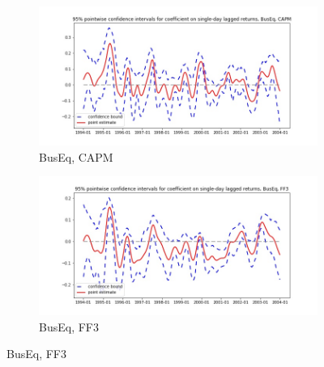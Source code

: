 \documentclass{article}
\begin{document}
\begin{figure}
  \begin{subfigure}[b]{0.5\textwidth}
    \centering
    \includegraphics[width=\textwidth]{BusEq/pointwiseCIs_CAPM.jpg}
    \caption{BusEq, CAPM}
    \label{fig:1}
  \end{subfigure}
  \begin{subfigure}[b]{0.5\textwidth}
    \centering
    \includegraphics[width=\textwidth]{BusEq/pointwiseCIs_FF3.jpg}
    \caption{BusEq, FF3}
    \label{fig:2}
  \end{subfigure}
  \end{figure}
  
\end{document}
